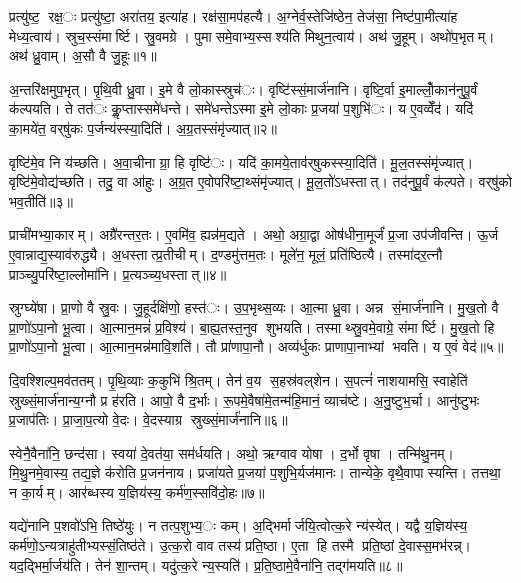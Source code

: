 प्रत्यु॑ष्ट॒ रक्ष॒ः प्रत्यु॑ष्टा॒ अरा॑तय॒ इत्या॑ह। रक्ष॑सा॒मप॑हत्यै। अ॒ग्नेर्व॒स्तेजि॑ष्ठेन॒ तेज॑सा॒ निष्ट॑पा॒मीत्या॑ह मेध्य॒त्वाय॑। स्रुच॒स्संमार्ष्टि। स्रु॒वमग्रे। पुमासमे॒वाभ्य॒स्सश्य॑ति मिथुन॒त्वाय॑। अथ॑ जु॒हूम्। अथो॑प॒भृतम्। अथ॑ ध्रु॒वाम्। अ॒सौ वै जु॒हूः॥१॥

अ॒न्तरि॑क्षमुप॒भृत्। पृ॒थि॒वी ध्रु॒वा। इ॒मे वै लो॒कास्स्रुच॑ः। वृष्टि॑स्सं॒मार्ज॑नानि। वृष्टि॒र्वा इ॒माल्लोँ॒कान॑नुपू॒र्वं क॑ल्पयति। ते तत॑ः कॢ॒प्तास्समे॑धन्ते। समे॑धन्तेऽस्मा इ॒मे लो॒काः प्र॒जया॑ प॒शुभि॑ः। य ए॒वव्वेँद॑। यदि॑ का॒मये॑त॒ वर्‌षु॑कः प॒र्जन्य॑स्स्या॒दिति॑। अ॒ग्र॒तस्संमृ॑ज्यात्॥२॥

वृष्टि॑मे॒व नि य॑च्छति। अ॒वा॒चीनाग्रा॒ हि वृष्टि॑ः। यदि॑ का॒मये॒ताव॑र्‌षुकस्स्या॒दिति॑। मू॒ल॒तस्संमृ॑ज्यात्। वृष्टि॑मे॒वोद्य॑च्छति। तदु॒ वा आ॑हुः। अ॒ग्र॒त ए॒वोपरि॑ष्टा॒थ्संमृ॑ज्यात्। मू॒ल॒तो॑ऽधस्तात्। तद॑नुपू॒र्वं क॑ल्पते। वर्‌षु॑को भव॒तीति॑॥३॥

प्राची॑मभ्या॒कारम्। अग्रै॑रन्तर॒तः। ए॒वमि॑व॒ ह्यन्न॑म॒द्यते। अथो॒ अग्रा॒द्वा ओष॑धीना॒मूर्जं॑ प्र॒जा उप॑जीवन्ति। ऊ॒र्ज ए॒वान्नाद्य॒स्याव॑रुद्ध्यै। अ॒धस्तात्प्र॒तीचीम्। द॒ण्डमु॑त्तम॒तः। मूले॑न॒ मूलं॒ प्रति॑ष्ठित्यै। तस्मा॑दर॒त्नौ प्राञ्च्यु॒परि॑ष्टा॒ल्लोमा॑नि। प्र॒त्यञ्च्य॒धस्तात्॥४॥

स्रुग्घ्ये॑षा। प्रा॒णो वै स्रु॒वः। जु॒हूर्दक्षि॑णो॒ हस्त॑ः। उ॒प॒भृथ्स॒व्यः। आ॒त्मा ध्रु॒वा। अन्न सं॒मार्ज॑नानि। मु॒ख॒तो वै प्रा॒णो॑ऽपा॒नो भू॒त्वा। आ॒त्मान॒मन्नं॑ प्र॒विश्य॑। बा॒ह्य॒तस्त॒नुव शुभयति। तस्माथ्स्रु॒वमे॒वाग्रे॒ संमार्ष्टि। मु॒ख॒तो हि प्रा॒णो॑ऽपा॒नो भू॒त्वा। आ॒त्मान॒मन्न॑मावि॒शति॑। तौ प्रा॑णापा॒नौ। अव्य॑र्धुकः प्राणापा॒नाभ्यां भवति। य ए॒वं वेद॑॥५॥


दि॒वश्शिल्प॒मव॑ततम्। पृ॒थि॒व्याः क॒कुभि॑ श्रि॒तम्। तेन॑ व॒य स॒हस्र॑वल्‌शेन। स॒पत्नं॑ नाशयामसि॒ स्वाहेति॑ स्रुख्सं॒मार्ज॑नान्य॒ग्नौ प्र ह॑रति। आपो॒ वै द॒र्भाः। रू॒पमे॒वैषा॑मे॒तन्म॑हि॒मानं॒ व्याच॑ष्टे। अ॒नु॒ष्टुभ॒र्चा। आनु॑ष्टुभः प्र॒जाप॑तिः। प्रा॒जा॒प॒त्यो वे॒दः। वे॒दस्याग्र स्रुख्सं॒मार्ज॑नानि॥६॥

स्वेनै॒वैना॑नि॒ छन्द॑सा। स्वया॑ दे॒वत॑या॒ सम॑र्धयति। अथो॒ ऋग्वाव योषा। द॒र्भो वृषा। तन्मि॑थु॒नम्। मि॒थु॒नमे॒वास्य॒ तद्य॒ज्ञे क॑रोति प्र॒जन॑नाय। प्रजा॑यते प्र॒जया॑ प॒शुभि॒र्यज॑मानः। तान्येके॒ वृथै॒वापास्यन्ति। तत्तथा॒ न का॒र्यम्। आर॑ब्धस्य य॒ज्ञिय॑स्य॒ कर्म॑ण॒स्सवि॑दो॒हः॥७॥

यद्ये॑नानि प॒शवो॑ऽभि॒ तिष्ठे॑युः। न तत्प॒शुभ्य॒ः कम्। अ॒द्भिर्मार्जयि॒त्वोत्क॒रे न्य॑स्येत्। यद्वै य॒ज्ञिय॑स्य॒ कर्म॑णो॒ऽन्यत्राहु॑तीभ्यस्सं॒तिष्ठ॑ते। उ॒त्क॒रो वाव तस्य॑ प्रति॒ष्ठा। ए॒ता हि तस्मै प्रति॒ष्ठां दे॒वास्स॒मभ॑रन्न्। यद॒द्भिर्मा॒र्जय॑ति। तेन॑ शा॒न्तम्। यदु॑त्क॒रे न्य॒स्यति॑। प्र॒ति॒ष्ठामे॒वैना॑नि॒ तद्ग॑मयति॥८॥

